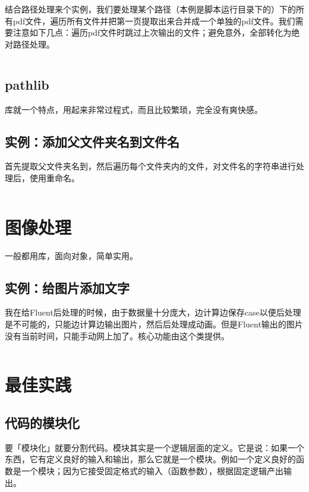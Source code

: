 结合路径处理来个实例，我们要处理某个路径（本例是脚本运行目录下的）下的所有pdf文件，遍历所有文件并把第一页提取出来合并成一个单独的pdf文件。我们需要注意如下几点：遍历pdf文件时跳过上次输出的文件；避免意外，全部转化为绝对路径处理。

\inputminted{python}{code/python/treat_pdf.py}

\subsection{pathlib}

库就一个特点，用起来非常过程式，而且比较繁琐，完全没有爽快感。

\subsection{实例：添加父文件夹名到文件名}

首先提取父文件夹名到，然后遍历每个文件夹内的文件，对文件名的字符串进行处理后，使用重命名。

\inputminted{python}{code/python/rename_case.py}

\section{图像处理}

一般都用库，面向对象，简单实用。

\subsection{实例：给图片添加文字}

我在给Fluent后处理的时候，由于数据量十分庞大，边计算边保存case以便后处理是不可能的，只能边计算边输出图片，然后后处理成动画。但是Fluent输出的图片没有当前时间，只能手动网上加了。核心功能由这个类提供。

\inputminted{python}{code/python/add_time_text.py}

\section{最佳实践}

\subsection{代码的模块化}

要「模块化」就要分割代码。模块其实是一个逻辑层面的定义。它是说：如果一个东西，它有定义良好的输入和输出，那么它就是一个模块。例如一个定义良好的函数是一个模块；因为它接受固定格式的输入（函数参数），根据固定逻辑产出输出。

